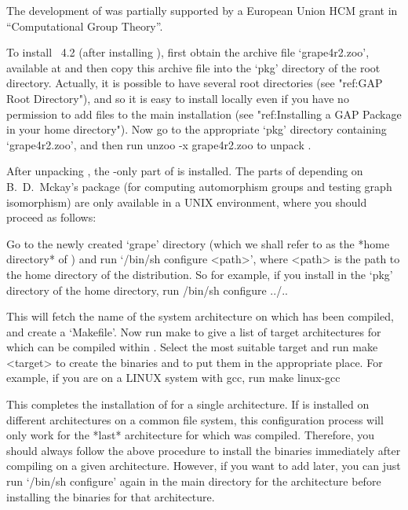 The development of {\GRAPE} was partially supported by a European Union
HCM grant in ``Computational Group Theory''.


To install {\GRAPE}~4.2 (after installing {\GAP}), first
obtain the {\GRAPE} archive file `grape4r2.zoo', available at
 and
then copy this archive file into the `pkg' directory of the {\GAP}
root directory. Actually, it is possible to have several {\GAP} root
directories (see "ref:GAP Root Directory"), and so it is easy to install
{\GRAPE} locally even if you have no permission to add files to the
main {\GAP} installation (see "ref:Installing a GAP Package in your
home directory"). Now go to the appropriate `pkg' directory containing
`grape4r2.zoo', and then run
\begintt
unzoo -x grape4r2.zoo
\endtt
to unpack {\GRAPE}.

After unpacking {\GRAPE}, the {\GAP}-only part of {\GRAPE} is installed.
The parts of {\GRAPE} depending on B.~D.~Mckay's {\nauty} package (for
computing automorphism groups and testing graph isomorphism) are only
available in a UNIX environment, where you should proceed as follows:

Go to the newly created `grape' directory (which we shall refer to as
the *home directory* of {\GRAPE}) and run `/bin/sh configure <path>',
where <path> is the path to the home directory of the {\GAP} distribution.
So for example, if you install {\GRAPE} in the `pkg' directory of the
{\GAP} home directory, run
\begintt
/bin/sh configure ../..
\endtt

This will fetch the name of the system architecture on which {\GAP}
has been compiled, and create a `Makefile'. Now run
\begintt
make
\endtt
to give a list of target architectures for which {\nauty} can be compiled 
within {\GRAPE}.  Select the most suitable target and run
\begintt   
make <target>
\endtt
to create the binaries and to put them in the appropriate place.
For example, if you are on a LINUX system with gcc, run
\begintt
make linux-gcc
\endtt

This completes the installation of {\GRAPE} for a single architecture.
If {\GAP} is installed on different architectures on a common file system,
this configuration process will only work for the *last* architecture
for which {\GAP} was compiled. Therefore, you should always follow
the above procedure to install the {\GRAPE} binaries immediately after
compiling {\GAP} on a given architecture. However, if you want to add
{\GRAPE} later, you can just run `/bin/sh configure' again in the main
{\GAP} directory for the architecture before installing the {\GRAPE}
binaries for that architecture.

